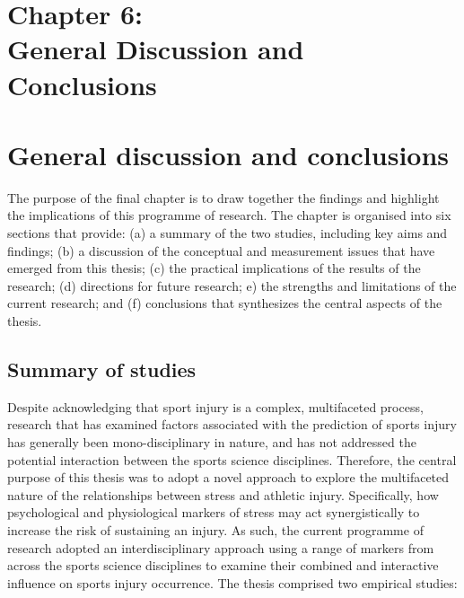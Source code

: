 \documentclass[man,floatsintext]{apa6}
\begin{document}
\vspace*{3cm}

\section[Chapter 6: General discussion and conclusions]{\Large{Chapter 6: \\ General Discussion and Conclusions}}

\clearpage

\hypertarget{general-discussion-and-conclusions}{%
\section{General discussion and conclusions}\label{general-discussion-and-conclusions}}

The purpose of the final chapter is to draw together the findings and highlight the implications of this programme of research.
The chapter is organised into six sections that provide: (a) a summary of the two studies, including key aims and findings; (b) a discussion of the conceptual and measurement issues that have emerged from this thesis; (c) the practical implications of the results of the research; (d) directions for future research; e) the strengths and limitations of the current research; and (f) conclusions that synthesizes the central aspects of the thesis.

\hypertarget{summary-of-studies}{%
\subsection{Summary of studies}\label{summary-of-studies}}

Despite acknowledging that sport injury is a complex, multifaceted process, research that has examined factors associated with the prediction of sports injury has generally been mono-disciplinary in nature, and has not addressed the potential interaction between the sports science disciplines.
Therefore, the central purpose of this thesis was to adopt a novel approach to explore the multifaceted nature of the relationships between stress and athletic injury.
Specifically, how psychological and physiological markers of stress may act synergistically to increase the risk of sustaining an injury.
As such, the current programme of research adopted an interdisciplinary approach using a range of markers from across the sports science disciplines to examine their combined and interactive influence on sports injury occurrence. The thesis comprised two empirical studies:
\end{document}
